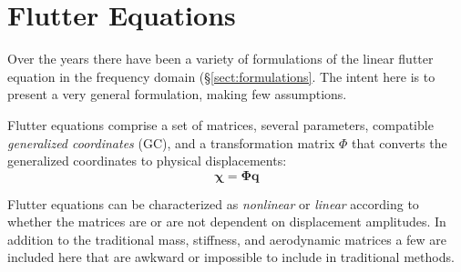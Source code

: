\documentclass[10pt,openany,twoside]{book}
\numberwithin{equation}{section}   %
\newcommand{\Matrix}[1]{\boldsymbol{#1}}
\newcommand{\Vector}[1]{\boldsymbol{#1}}
\newcommand{\Gc}{GC}
\newcommand{\Sectref}[1]{\S\ref{#1}}
\begin{document}
\newpage
\chapter{Flutter Equations}\label{chap:flutter-equations}
Over the years there have been a variety of formulations of the
linear flutter equation in the frequency domain (\Sectref{sect:formulations}.
The intent here is to present a very general formulation, making few
assumptions.

Flutter equations comprise a set of matrices, several parameters, compatible
\emph{generalized coordinates} (\Gc), and a transformation matrix
$\Phi$ that converts the generalized coordinates to physical
displacements:
\begin{displaymath}
\Vector{\chi} = \Matrix{\Phi}\Vector{q}
\end{displaymath}

Flutter equations can be characterized as \emph{nonlinear} or
\emph{linear} according to whether the matrices
are or are not dependent on displacement amplitudes.
In addition to the traditional mass, stiffness, and aerodynamic
matrices a few are included here that are awkward or impossible to include
in traditional methods.
\end{document}
